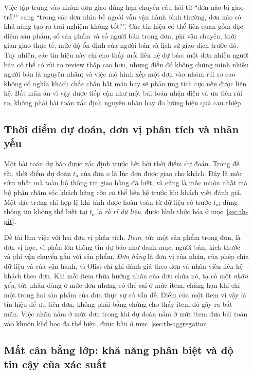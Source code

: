 \documentclass[12pt,a4paper]{report}
\begin{document}
Việc tập trung vào nhóm đơn giao đúng hạn chuyển câu hỏi từ ``đơn nào bị giao trễ?'' sang ``trong các đơn nhìn bề ngoài vẫn vận hành bình thường, đơn nào có khả năng tạo ra trải nghiệm không tốt?''. Các tín hiệu có thể liên quan gồm đặc điểm sản phẩm, số sản phẩm và số người bán trong đơn, phí vận chuyển, thời gian giao thực tế, mức độ ổn định của người bán và lịch sử giao dịch trước đó. Tuy nhiên, các tín hiệu này chỉ cho thấy mối liên hệ dự báo: một đơn nhiều người bán có thể có rủi ro review thấp cao hơn, nhưng điều đó không chứng minh nhiều người bán là nguyên nhân; và việc mô hình xếp một đơn vào nhóm rủi ro cao không có nghĩa khách chắc chắn bất mãn hay sẽ phản ứng tích cực nếu được liên hệ. Bất mãn ẩn vì vậy được tiếp cận như một bài toán nhận diện và ưu tiên rủi ro, không phải bài toán xác định nguyên nhân hay đo lường hiệu quả can thiệp.

\subsection{Thời điểm dự đoán, đơn vị phân tích và nhãn yếu}\label{sec:con-units}

Một bài toán dự báo được xác định trước hết bởi thời điểm dự đoán. Trong đề tài, thời điểm dự đoán $t_o$ của đơn $o$ là lúc đơn được giao cho khách. Đây là mốc sớm nhất mà toàn bộ thông tin giao hàng đã biết, và cũng là mốc muộn nhất mà bộ phận chăm sóc khách hàng còn có thể liên hệ trước khi khách viết đánh giá. Một đặc trưng chỉ hợp lệ khi tính được hoàn toàn từ dữ liệu có trước $t_o$; dùng thông tin không thể biết tại $t_o$ là \emph{rò rỉ dữ liệu}, được hình thức hóa ở mục~\ref{sec:th-pit}.

Đề tài làm việc với hai đơn vị phân tích. \emph{Item}, tức một sản phẩm trong đơn, là đơn vị học, vì phần lớn thông tin dự báo như danh mục, người bán, kích thước và phí vận chuyển gắn với sản phẩm. \emph{Đơn hàng} là đơn vị của nhãn, của phép chia dữ liệu và của vận hành, vì Olist chỉ ghi đánh giá theo đơn và nhân viên liên hệ khách theo đơn. Khi mỗi item thừa hưởng nhãn của đơn chứa nó, ta có một \emph{nhãn yếu}, tức nhãn đúng ở mức đơn nhưng có thể sai ở mức item, chẳng hạn khi chỉ một trong hai sản phẩm của đơn thực sự có vấn đề. Điểm của một item vì vậy là tín hiệu để ưu tiên đơn, không phải bằng chứng cho thấy item đó gây ra bất mãn. Việc nhãn nằm ở mức đơn trong khi dự đoán nằm ở mức item đưa bài toán vào khuôn khổ học đa thể hiện, được bàn ở mục~\ref{sec:th-aggregation}.

\subsection{Mất cân bằng lớp: khả năng phân biệt và độ tin cậy của xác suất}\label{sec:con-imbalance}
\end{document}
